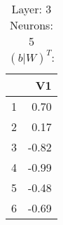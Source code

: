 \begin{table}[ht]
\centering
\begin{tabular}{rr}
  \hline
 & V1 \\ 
  \hline
1 & 0.70 \\ 
  2 & 0.17 \\ 
  3 & -0.82 \\ 
  4 & -0.99 \\ 
  5 & -0.48 \\ 
  6 & -0.69 \\ 
   \hline
\end{tabular}
\caption{Layer: 3 Neurons: 5  $(b|W)^T$: 
} 
\end{table}
